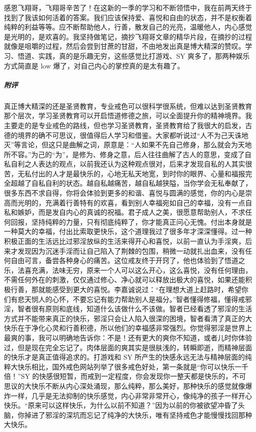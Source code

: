\begin{case}
    感恩飞翔哥，飞翔哥辛苦了！在这新的一季的学习和不断领悟中，我在前两天终于找到了我该如何活着的答案。我们应该保持爱、喜悦和自由的状态，并不是权衡着纯粹的利益等等。应不断帮助他人，行善，散发自己的光亮，温暖他人，内心感觉是光明的，是欢喜的。我坚持做笔记，摘抄飞翔哥文章的精华片段，在摘抄的过程就像是咀嚼的过程，然后会尝到甘蔗的甘甜，不由地发出真是博大精深的赞叹。学习、悟道、实践，真的是乐趣无穷，这些感觉比打游戏、SY 爽多了，那两种娱乐方式简直是 low 爆了，对自己内心的掌控真的是太有趣了。
    \subparagraph{附评} 真正博大精深的还是圣贤教育，专业戒色可以很科学很系统，但难以达到圣贤教育那个层次，学习圣贤教育可以开启悟道修德之旅，可以全面提升你的精神境界。我主要走的是专业戒色的路线，但也学习圣贤教育，圣贤教育给了我很大的启发，古德的境界的确不可思议，很值得后人学习和借鉴。大家都听说过“人不为己天诛地灭”等言论，但这只是曲解之词，原意是：“人如果不先自己修身，那么就会为天地所不容。”为己的“为”，是修为、修身之意，后人往往曲解了古人的意思，变成了自私自利之人表达的观点，以前我还认为这种观点很对，后来才发现自私的人其实很苦，无私付出的人才是最快乐的，心地无私天地宽，到时你的眼界、心量和福报完全超越了自私自利的状态。越自私越痛苦，越自私越狭隘，当你学会无私奉献了，很多东西不求自得，你将会体验到更多的和谐、喜悦与圆满的感觉，你的内心是崇高而光明的，充满着行善特有的欢喜，看到别人幸福宛如自己的幸福，没有一点自私和嫉妒，而是发自内心的真诚的祝福。君子成人之美，很愿意帮助别人，不求任何回报，坚持纯粹的力量，只有彻底纯粹了，你才能真正问心无愧。付出本身就是一种莫大的幸福，付出比索取更快乐，这个道理我过了很多年才深深懂得。过一种积极正面的生活远比过邪淫放纵的生活来得开心和喜悦，以前一直认为手淫爽，后来才发现因为沉迷手淫而让自己陷入了荆棘的包围，稍微一动就扎出血来，没有任何自由可言，备尝各种身心的痛苦。这位戒友终于开窍了，他也体验到了悟道之乐，法喜充满，法味无穷，原来一个人可以这么开心，这么喜悦，没有任何理由，不需任何外在的刺激，仅仅通过修心、净心就可以释放出极大的喜悦，如果还能积极行善，那就能感受到更大的喜悦。李嘉诚说过：“在理想大道上赶路时，希望你们有悲天悯人的心怀，不要忘记有能力帮助别人是福分。”智者懂得修福，懂得戒邪淫，智者很有原则和底线，知道什么该做什么不该做。智者已经看透了邪淫的生活方式并不能带来真正的快乐，邪淫只会让人陷入很深的困境，智者看清了真正的大快乐在于净化心灵和行善积德，所以他们的幸福感非常强烈。你觉得邪淫是世界上最爽的事，我可以明确地告诉你：不是！还有更大的爽你不知道，或者儿时你体验过，但是现在完全忘记了。肉体层面的爽其实是很肤浅的，转瞬即逝，而精神层面的快乐才是真正值得追求的。打游戏和 SY 所产生的快感永远无法与精神层面的纯粹大快乐相比，国外戒色网站列举了很多戒色好处，第一条就是“你可以快乐一千倍！”SY 的快感很短暂，而戒到一定程度，你会发现你一整天都是快乐的，不可思议的大快乐不断从内心深处涌现，那么纯粹，那么美好，那种快乐的感觉就像爆炸一样，几乎是无法抑制的快乐感觉，内心非常非常开心，像纯净的孩子一样开心快乐。“原来可以这样快乐，为什么以前不知道？”因为以前的你被欲望冲昏了头脑，你掉进了邪淫的深坑而忘记了纯净的大快乐，唯有坚持戒色才能慢慢找回那种大快乐。
\end{case}

